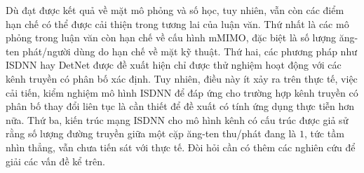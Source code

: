 Dù đạt được kết quả về mặt mô phỏng và số học, tuy nhiên, vẫn còn các điểm hạn chế có thể được cải thiện trong tương lai của luận văn. Thứ nhất là các mô phỏng trong luận văn còn hạn chế về cấu hình mMIMO, đặc biệt là số lượng ăng-ten phát/người dùng do hạn chế về mặt kỹ thuật. Thứ hai, các phương pháp như ISDNN hay DetNet được đề xuất hiện chỉ được thử nghiệm hoạt động với các kênh truyền có phân bố xác định. Tuy nhiên, điều này ít xảy ra trên thực tế, việc cải tiến, kiểm nghiệm mô hình ISDNN để đáp ứng cho trường hợp kênh truyền có phân bố thay đổi liên tục là cần thiết để đề xuất có tính ứng dụng thực tiễn hơn nữa. Thứ ba, kiến trúc mạng ISDNN cho mô hình kênh có cấu trúc được giả sử rằng số lượng đường truyền giữa một cặp ăng-ten thu/phát đang là $1$, tức tầm nhìn thẳng, vẫn chưa tiến sát với thực tế. Đòi hỏi cần có thêm các nghiên cứu để giải các vấn đề kể trên.